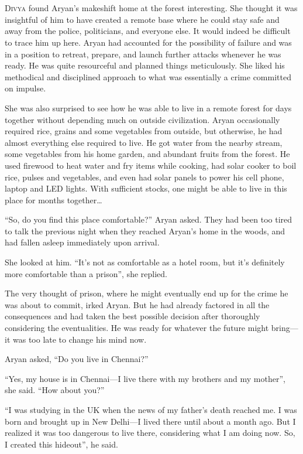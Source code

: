 \chapter{}

\lettrine{D}{ivya} found Aryan's makeshift home at the forest interesting. She thought it was
insightful of him to have created a remote base where he could stay safe and
away from the police, politicians, and everyone else. It would indeed be difficult
to trace him up here. Aryan had accounted for the possibility of failure and was in a
position to retreat, prepare, and launch further attacks whenever he was ready.
He was quite resourceful and planned things meticulously. She liked his
methodical and disciplined approach to what was essentially a crime committed on
impulse.

She was also surprised to see how he was able to live in a remote forest for
days together without depending much on outside civilization. Aryan
occasionally required rice, grains and some vegetables from outside, but
otherwise, he had almost everything else required to live. He got
water from the nearby stream, some vegetables from his home garden, and
abundant fruits from the forest. He used firewood to heat water and fry items
while cooking, had solar cooker to boil rice, pulses and vegetables, and even
had solar panels to power his cell phone, laptop and LED lights. With sufficient
stocks, one might be able to live in this place for months together…

“So, do you find this place comfortable?” Aryan asked. They had been too tired to
talk the previous night when they reached Aryan's home in the woods, and had
fallen asleep immediately upon arrival.

She looked at him. “It's not as comfortable as a hotel room, but it's definitely more
comfortable than a prison”, she replied.

The very thought of prison, where he might eventually end up for the crime he was
about to commit, irked Aryan. But he had already factored in all the consequences and
had taken the best possible decision after thoroughly considering the eventualities.
He was ready for whatever the future might bring—it was too
late to change his mind now.

Aryan asked, “Do you live in Chennai?”

“Yes, my house is in Chennai—I live there with my brothers and my mother”, she
said. “How about you?”

“I was studying in the UK when the news of my father's death reached me. I was
born and brought up in New Delhi—I lived there until about a month ago. But I
realized it was too dangerous to live there, considering what I am doing now.
So, I created this hideout”, he said.

